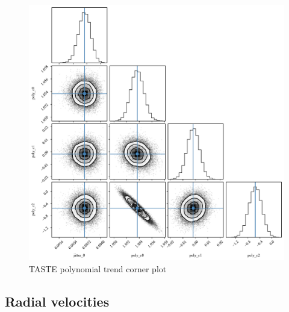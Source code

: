 \documentclass[a4paper,11pt,twocolumn]{article}
\begin{document}
\begin{figure}[H]
  \centering
    \includegraphics[scale=0.4, angle=0]{../pictures/taste/poly.pdf}
    \caption{TASTE polynomial trend corner plot}
\end{figure}



\subsection{Radial velocities}
\label{sect:app_C_RV}
\end{document}
